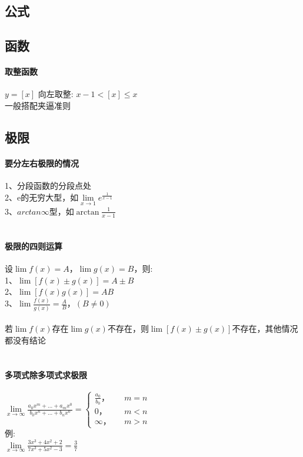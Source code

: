\documentclass{article}
\begin{document}
\begin{flushleft}
	\LARGE
	
	\section{公式}
	
	\subsection{函数}
	
	\paragraph{取整函数}
	$y=[x]$ 向左取整: $x-1<[x]\leq x$\\
	一般搭配夹逼准则\\\huge

	\subsection{极限}
	
	\paragraph{要分左右极限的情况}
	1、分段函数的分段点处\\
	2、e的无穷大型，如$\lim\limits_{x\to 1} e^{\frac{1}{x-1}}$\\
	3、$arctan\infty$型，如$\arctan{\frac{1}{x-1}}$\\
	~\\
	\paragraph{极限的四则运算}
	设$\lim f(x)=A，\lim g(x)=B$，则:\\
	1、$\lim [f(x)\pm g(x)]=A\pm B$\\
	2、$\lim [f(x)g(x)]=AB$\\
	3、$\lim \frac{f(x)}{g(x)} =\frac{A}{B}，(B\neq 0)$\\
	~\\
	若$\lim f(x)$存在$\lim g(x)$不存在，则$\lim [f(x)\pm g(x)]$不存在，其他情况都没有结论\\
	~\\
	\paragraph{多项式除多项式求极限}
	$\lim\limits_{x\to \infty} \frac{a_0x^m+...+a_mx^0}{b_0x^n+...+b_nx^0}=
	\left\{
	\begin{array}{rcl}
	\frac{a_0}{b_0}，& & {m=n}\\
	0，& & {m<n}\\
	\infty，& & {m>n}
	\end{array} \right.$\\
	例:\\
	$\lim\limits_{x\to \infty} \frac{3x^3+4x^2+2}{7x^3+5x^2-3} = \frac{3}{7}$\\
	~\\

\end{flushleft}
\end{document}
